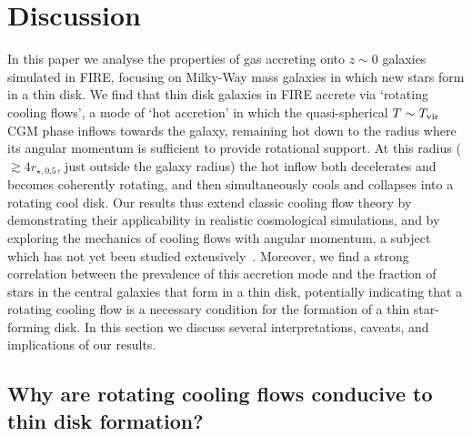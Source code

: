 \documentclass[fleqn,usenatbib]{mnras}
\newcommand{\Tvir}{T_{\rm vir}}
\begin{document}
\section{Discussion}
\label{s: discussion}

In this paper we analyse the properties of gas accreting onto $z\sim0$ galaxies simulated in FIRE, focusing on Milky-Way mass galaxies in which new stars form in a thin disk. 
We find that thin disk galaxies in FIRE accrete via `rotating cooling flows', a mode of `hot accretion' in which the quasi-spherical $T\sim\Tvir$ CGM phase inflows towards the galaxy, remaining hot down to the radius where its angular momentum is sufficient to provide rotational support.
At this radius ($\gtrsim 4 r_{\star,0.5}$, just outside the galaxy radius) the hot inflow both decelerates and becomes coherently rotating, and then simultaneously cools and collapses into a rotating cool disk.
Our results thus extend classic cooling flow theory by demonstrating their applicability in realistic cosmological simulations, and by exploring the mechanics of cooling flows with angular momentum, a subject which has not yet been studied extensively~\citep[c.f.][]{Cowie1980, Stern2020}.
Moreover, we find a strong correlation between the prevalence of this accretion mode and the fraction of stars in the central galaxies that form in a thin disk, potentially indicating that a rotating cooling flow is a necessary condition for the formation of a thin star-forming disk.
In this section we discuss several interpretations, caveats, and implications of our results. 

\subsection{Why are rotating cooling flows conducive to thin disk formation?}
\label{s: why CFs thin disks}
\end{document}
